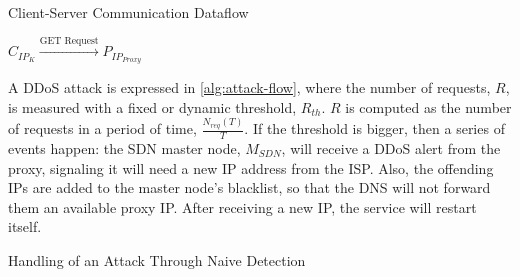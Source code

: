\begin{algorithm}[ht]
    \caption{Client-Server Communication Dataflow}
    \label{alg:data-flow}
    \LinesNotNumbered
    \vspace{6pt}
    $C_{IP_K} \xrightarrow{\text{GET Request}} P_{IP_{Proxy}}$\;
    \vspace{4pt}
\end{algorithm}

A DDoS attack is expressed in \autoref{alg:attack-flow}\cite{vladescu2025}, where the number of requests, $R$, is measured with a fixed or dynamic threshold, $R_{th}$. $R$ is computed as the number of requests in a period of time, $\frac{N_{req}(T)}{T}$. If the threshold is bigger, then a series of events happen: the SDN master node, $M_{SDN}$, will receive a DDoS alert from the proxy, signaling it will need a new IP address from the ISP. Also, the offending IPs are added to the master node's blacklist, so that the DNS will not forward them an available proxy IP. After receiving a new IP, the service will restart itself.

\begin{algorithm}[ht]
    \caption{Handling of an Attack Through Naive Detection}
    \label{alg:attack-flow}
    \vspace{6pt}
    \EndWhile{}
\end{algorithm}
